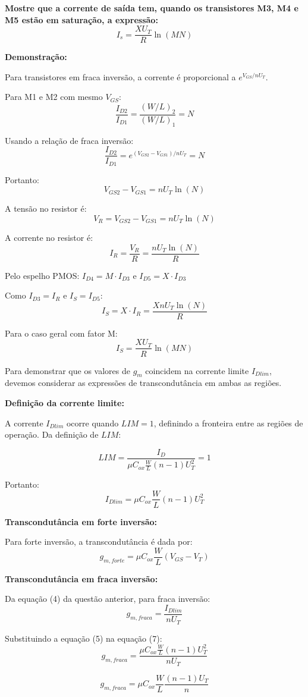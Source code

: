 ﻿\documentclass[12pt,a4paper]{article}
\begin{document}
\textbf{Mostre que a corrente de saída tem, quando os transistores M3, M4 e M5 estão em saturação, a expressão:}
$$I_s = \frac{XU_T}{R} \ln(MN)$$

\textbf{Demonstração:}

Para transistores em fraca inversão, a corrente é proporcional a $e^{V_{GS}/nU_T}$. 

Para M1 e M2 com mesmo $V_{GS}$:
$$\frac{I_{D2}}{I_{D1}} = \frac{(W/L)_2}{(W/L)_1} = N$$

Usando a relação de fraca inversão:
$$\frac{I_{D2}}{I_{D1}} = e^{(V_{GS2} - V_{GS1})/nU_T} = N$$

Portanto:
$$V_{GS2} - V_{GS1} = nU_T \ln(N)$$

A tensão no resistor é:
$$V_R = V_{GS2} - V_{GS1} = nU_T \ln(N)$$

A corrente no resistor é:
$$I_R = \frac{V_R}{R} = \frac{nU_T \ln(N)}{R}$$

Pelo espelho PMOS: $I_{D4} = M \cdot I_{D3}$ e $I_{D5} = X \cdot I_{D3}$

Como $I_{D3} = I_R$ e $I_S = I_{D5}$:
$$I_S = X \cdot I_R = \frac{XnU_T \ln(N)}{R}$$

Para o caso geral com fator M:
$$\boxed{I_S = \frac{XU_T}{R} \ln(MN)}$$

Para demonstrar que os valores de $g_m$ coincidem na corrente limite $I_{Dlim}$, devemos considerar as expressões de transcondutância em ambas as regiões.

\textbf{Definição da corrente limite:}

A corrente $I_{Dlim}$ ocorre quando $LIM = 1$, definindo a fronteira entre as regiões de operação. Da definição de $LIM$:

$$LIM = \frac{I_D}{\mu C_{ox} \frac{W}{L} (n-1) U_T^2} = 1$$

Portanto:
$$I_{Dlim} = \mu C_{ox} \frac{W}{L} (n-1) U_T^2 $$

\textbf{Transcondutância em forte inversão:}

Para forte inversão, a transcondutância é dada por:
$$g_{m,forte} = \mu C_{ox} \frac{W}{L} (V_{GS} - V_T) $$

\textbf{Transcondutância em fraca inversão:}

Da equação (4) da questão anterior, para fraca inversão:
$$g_{m,fraca} = \frac{I_{Dlim}}{nU_T} $$

Substituindo a equação (5) na equação (7):
$$g_{m,fraca} = \frac{\mu C_{ox} \frac{W}{L} (n-1) U_T^2}{nU_T}$$

$$g_{m,fraca} = \mu C_{ox} \frac{W}{L} \frac{(n-1)U_T}{n} $$
\end{document}
